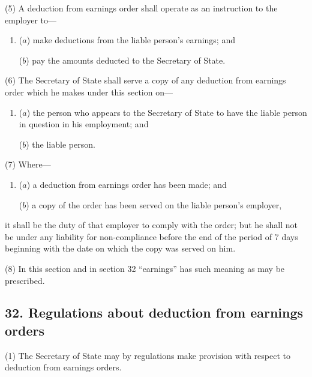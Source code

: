 \documentclass[12pt,a4paper]{article}
\begin{document}
(5) A deduction from earnings order shall operate as an instruction to the employer to—
\begin{enumerate}\item[]
($a$) make deductions from the liable person’s earnings; and

($b$) pay the amounts deducted to the Secretary of State.
\end{enumerate}

(6) The Secretary of State shall serve a copy of any deduction from earnings order which he makes under this section on—
\begin{enumerate}\item[]
($a$) the person who appears to the Secretary of State to have the liable person in question in his employment; and

($b$) the liable person.
\end{enumerate}

(7) Where—
\begin{enumerate}\item[]
($a$) a deduction from earnings order has been made; and

($b$) a copy of the order has been served on the liable person’s employer,
\end{enumerate}
it shall be the duty of that employer to comply with the order; but he shall not be under any liability for non-compliance before the end of the period of 7 days beginning with the date on which the copy was served on him.

(8) In this section and in section 32 “earnings” has such meaning as may be prescribed.


\subsection{32. Regulations about deduction from earnings orders}

(1) The Secretary of State may by regulations make provision with respect to deduction from earnings orders.
\end{document}
